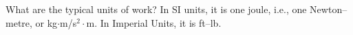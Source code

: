 {What are the typical units of work?}
{In SI units, it is one joule, i.e., one Newton--metre, or kg$\cdot$m/s$^2\cdot$m. In Imperial Units, it is ft--lb.}
